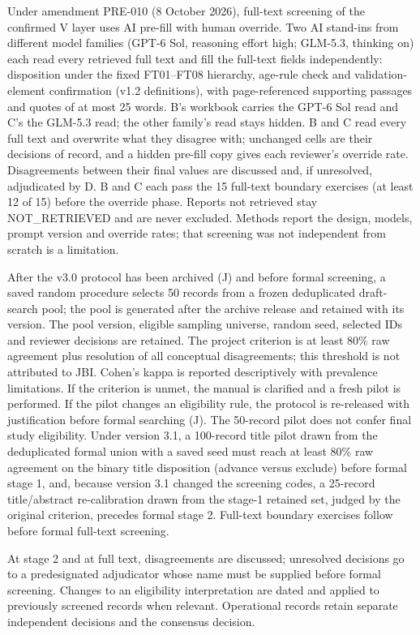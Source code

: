 \documentclass[
  11pt,
  a4paper,
]{article}
\begin{document}
Under amendment PRE-010 (8 October 2026), full-text screening of the
confirmed V layer uses AI pre-fill with human override. Two AI stand-ins
from different model families (GPT-6 Sol, reasoning effort high;
GLM-5.3, thinking on) each read every retrieved full text and fill the
full-text fields independently: disposition under the fixed FT01--FT08
hierarchy, age-rule check and validation-element confirmation (v1.2
definitions), with page-referenced supporting passages and quotes of at
most 25 words. B's workbook carries the GPT-6 Sol read and C's the
GLM-5.3 read; the other family's read stays hidden. B and C read every
full text and overwrite what they disagree with; unchanged cells are
their decisions of record, and a hidden pre-fill copy gives each
reviewer's override rate. Disagreements between their final values are
discussed and, if unresolved, adjudicated by D. B and C each pass the 15
full-text boundary exercises (at least 12 of 15) before the override
phase. Reports not retrieved stay NOT\_RETRIEVED and are never excluded.
Methods report the design, models, prompt version and override rates;
that screening was not independent from scratch is a limitation.

After the v3.0 protocol has been archived (J) and before formal
screening, a saved random procedure selects 50 records from a frozen
deduplicated draft-search pool; the pool is generated after the archive
release and retained with its version. The pool version, eligible
sampling universe, random seed, selected IDs and reviewer decisions are
retained. The project criterion is at least 80\% raw agreement plus
resolution of all conceptual disagreements; this threshold is not
attributed to JBI. Cohen's kappa is reported descriptively with
prevalence limitations. If the criterion is unmet, the manual is
clarified and a fresh pilot is performed. If the pilot changes an
eligibility rule, the protocol is re-released with justification before
formal searching (J). The 50-record pilot does not confer final study
eligibility. Under version 3.1, a 100-record title pilot drawn from the
deduplicated formal union with a saved seed must reach at least 80\% raw
agreement on the binary title disposition (advance versus exclude)
before formal stage 1, and, because version 3.1 changed the screening
codes, a 25-record title/abstract re-calibration drawn from the stage-1
retained set, judged by the original criterion, precedes formal stage 2.
Full-text boundary exercises follow before formal full-text screening.

At stage 2 and at full text, disagreements are discussed; unresolved
decisions go to a predesignated adjudicator whose name must be supplied
before formal screening. Changes to an eligibility interpretation are
dated and applied to previously screened records when relevant.
Operational records retain separate independent decisions and the
consensus decision.
\end{document}

